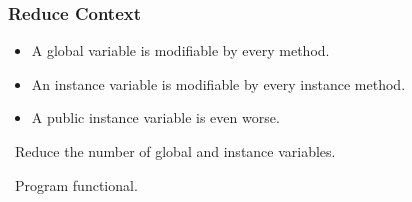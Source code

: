 \begin{frame}

\frametitle{Reduce Context}

\begin{itemize}

\item A global variable is modifiable by every method.

\item An instance variable is modifiable by every instance method.

\item A public instance variable is even worse.

\end{itemize}

\vspace{\fill}

\begin{center}

\leftthumbsup~Reduce the number of global and instance variables.~\rightthumbsup

\end{center}

\begin{center}

\leftthumbsup~Program functional.~\rightthumbsup

\end{center}

\end{frame}
